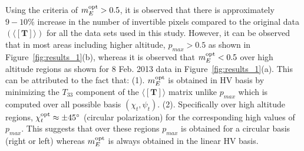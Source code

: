 Using the criteria of $m_{E}^{\mbox{\scriptsize opt}} > 0.5$, it is observed that there is approximately $9-10\%$ increase in the number of invertible pixels compared to the original data $(\langle[{\mathbf{T}}]\rangle)$ for all the data sets used in this study. However, it can be observed that in most areas including higher altitude, $p_{max} > 0.5$ as shown in Figure~\ref{fig:results_1}(b), whereas it is observed that $m_{E}^{\mbox{\scriptsize opt}} < 0.5$ over high altitude regions as shown for 8 Feb. 2013 data in Figure~\ref{fig:results_1}(a). This can be attributed to the fact that: (1). $m_{E}^{\mbox{\scriptsize opt}}$ is obtained in HV basis by minimizing the $T_{33}$ component of the $\langle[\mathbf{T}]\rangle$ matrix unlike $p_{max}$ which is computed over all possible basis $(\chi_{t},\psi_{t})$. (2). Specifically over high altitude regions, $\chi_{t}^{\mbox{\scriptsize opt}} \approx \pm 45^\circ$ (circular polarization) for the corresponding high values of $p_{max}$. This suggests that over these regions $p_{max}$ is obtained for a circular basis (right or left) whereas $m_{E}^{\mbox{\scriptsize opt}}$ is always obtained in the linear HV basis.


